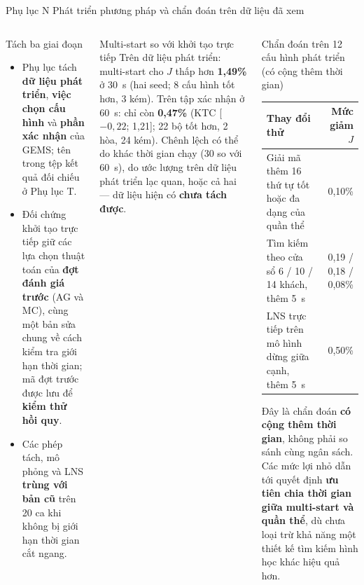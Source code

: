 \documentclass[aspectratio=169,10pt,t,xcolor={table}]{beamer}
\newcommand{\apptitle}[2]{Phụ lục #1 \textperiodcentered{} #2}
\begin{document}
\begin{frame}[label=appN]{\apptitle{N}{Phát triển phương pháp và chẩn đoán trên dữ liệu đã xem}}
\begin{columns}[T,onlytextwidth]
\begin{block}{Tách ba giai đoạn}
\scriptsize
\begin{itemize}
\item Phụ lục tách \textbf{dữ liệu phát triển}, \textbf{việc chọn cấu hình} và \textbf{phần xác nhận} của GEMS; tên trong tệp kết quả đối chiếu ở Phụ lục T.
\item Đối chứng khởi tạo trực tiếp giữ các lựa chọn thuật toán của \textbf{đợt đánh giá trước} (AG và MC), cùng một bản sửa chung về cách kiểm tra giới hạn thời gian; mã đợt trước được lưu để \textbf{kiểm thử hồi quy}.
\item Các phép tách, mô phỏng và LNS \textbf{trùng với bản cũ} trên 20 ca khi không bị giới hạn thời gian cắt ngang.
\end{itemize}
\end{block}
\begin{alertblock}{Multi-start so với khởi tạo trực tiếp}
\scriptsize Trên dữ liệu phát triển: multi-start cho $J$ thấp hơn \textbf{1,49\%} ở 30~s (hai seed; 8 cấu hình tốt hơn, 3 kém). Trên tập xác nhận ở 60~s: chỉ còn \textbf{0,47\%} (KTC [$-0{,}22$; 1,21]; 22 bộ tốt hơn, 2 hòa, 24 kém). Chênh lệch có thể do khác thời gian chạy (30 so với 60~s), do ước lượng trên dữ liệu phát triển lạc quan, hoặc cả hai --- dữ liệu hiện có \textbf{chưa tách được}.
\end{alertblock}
\begin{block}{Chẩn đoán trên 12 cấu hình phát triển (có cộng thêm thời gian)}
\scriptsize
\renewcommand{\arraystretch}{1.2}
\begin{tabularx}{\linewidth}{@{}Yr@{}}
\toprule
\textbf{Thay đổi thử} & \textbf{Mức giảm $J$}\\\midrule
Giải mã thêm 16 thứ tự tốt hoặc đa dạng của quần thể & 0,10\%\\
Tìm kiếm theo cửa sổ 6 / 10 / 14 khách, thêm 5~s & 0,19 / 0,18 / 0,08\%\\
LNS trực tiếp trên mô hình dừng giữa cạnh, thêm 5~s & 0,50\%\\
\bottomrule
\end{tabularx}
\vspace{2pt}
Đây là chẩn đoán \textbf{có cộng thêm thời gian}, không phải so sánh cùng ngân sách. Các mức lợi nhỏ dẫn tới quyết định \textbf{ưu tiên chia thời gian giữa multi-start và quần thể}, dù chưa loại trừ khả năng một thiết kế tìm kiếm hình học khác hiệu quả hơn.
\end{block}
\end{columns}
\end{frame}
\end{document}
